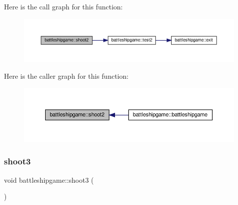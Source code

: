 Here is the call graph for this function\+:
\nopagebreak
\begin{figure}[H]
\begin{center}
\leavevmode
\includegraphics[width=350pt]{classbattleshipgame_ab43d1b9348297ee4260ee31963efd49c_cgraph}
\end{center}
\end{figure}
Here is the caller graph for this function\+:
\nopagebreak
\begin{figure}[H]
\begin{center}
\leavevmode
\includegraphics[width=350pt]{classbattleshipgame_ab43d1b9348297ee4260ee31963efd49c_icgraph}
\end{center}
\end{figure}
\mbox{\label{classbattleshipgame_afce5fc9dedff42dd1fb8e43bd6dde974}} 
\subsubsection{\texorpdfstring{shoot3}{shoot3}}
{\footnotesize\ttfamily void battleshipgame\+::shoot3 (\begin{DoxyParamCaption}{ }\end{DoxyParamCaption})\hspace{0.3cm}{\ttfamily [slot]}}

